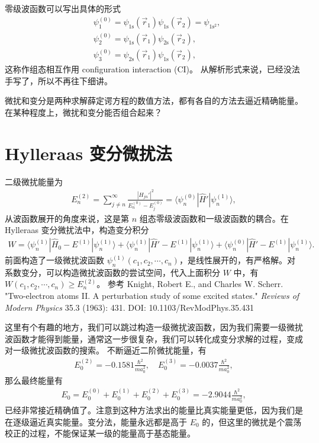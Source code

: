 零级波函数可以写出具体的形式
\begin{align}
    &\psi_1^{(0)} = \psi_{\mathrm{1s}}(\vec r_1) \psi_{\mathrm{1s}}(\vec r_2) = \psi_{\mathrm{1s^2}}, \\
    &\psi_2^{(0)} = \psi_{\mathrm{1s}}(\vec r_1) \psi_{\mathrm{2s}} (\vec r_2), \\
    &\psi_3^{(0)} = \psi_{\mathrm{2s}}(\vec r_1) \psi_{\mathrm{1s}}(\vec r_2),
\end{align}
这称作组态相互作用 configuration interaction (CI)。
从解析形式来说，已经没法手写了，所以不再往下细讲。

微扰和变分是两种求解薛定谔方程的数值方法，都有各自的方法去逼近精确能量。在某种程度上，微扰和变分能否组合起来？

\section{Hylleraas 变分微扰法}
二级微扰能量为
\begin{align}
    E_n^{(2)} = \sum_{j\neq n}^{\infty} \frac{|H_{jn}'|^2}{E_n^{(0)}-E_j^{(0)}} = \langle \psi_n^{(0)} | \hat H' | \psi_n^{(1)} \rangle, 
\end{align}
从波函数展开的角度来说，这是第 $n$ 组态零级波函数和一级波函数的耦合。在 Hylleraas 变分微扰法中，构造变分积分 
\begin{align}
    W = \langle \psi_n^{(1)} | \hat H_0 - E^{(1)} | \psi_n^{(1)} \rangle 
    + \langle \psi_n^{(1)} | \hat H' - E^{(1)} | \psi_n^{(1)} \rangle 
    + \langle \psi_n^{(0)} | \hat H' - E^{(1)} | \psi_n^{(1)} \rangle. 
\end{align}
前面构造了一级微扰波函数 $\psi_n^{(1)}(c_1, c_2, \cdots, c_n)$，是线性展开的，有严格解。对系数变分，可以构造微扰波函数的尝试空间，代入上面积分 $W$ 中，有 $W(c_1, c_2, \cdots, c_n) \geqslant E_n^{(2)}$。
参考 Knight, Robert E., and Charles W. Scherr. "Two-electron atoms II. A perturbation study of some excited states." \textit{Reviews of Modern Physics} 35.3 (1963): 431. DOI: 10.1103/RevModPhys.35.431 

这里有个有趣的地方，我们可以跳过构造一级微扰波函数，因为我们需要一级微扰波函数才能得到能量，通常这一步很复杂，我们可以转化成变分求解的过程，变成对一级微扰波函数的搜索。
不断逼近二阶微扰能量，有
\begin{align}
    E_0^{(2)} = -0.1581 \frac{\hbar^2}{ma_0^2}, \quad E_0^{(3)} = \num{-0.0037} \frac{\hbar^2}{ma_0^2},
\end{align}
那么最终能量有
\begin{align}
    E_0 = E_0^{(0)} + E_0^{(1)} + E_0^{(2)} + E_0^{(3)} = \num{-2.9044} \frac{\hbar^2}{ma_0^2},
\end{align}
已经非常接近精确值了。注意到这种方法求出的能量比真实能量更低，因为我们是在逐级逼近真实能量。变分法，能量永远都是高于 $E_0$ 的，但这里的微扰是个震荡校正的过程，不能保证某一级的能量高于基态能量。

